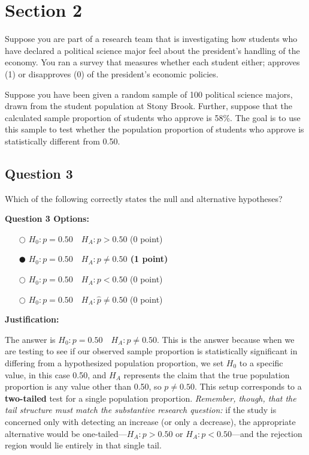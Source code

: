 \documentclass[12pt]{article}
\begin{document}
\section*{Section 2}

Suppose you are part of a research team that is investigating how students who have declared a political science major feel about the president’s handling of the economy. You ran a survey that measures whether each student either; approves (1) or disapproves (0) of the president’s economic policies.

Suppose you have been given a random sample of 100 political science majors, drawn from the student population at Stony Brook. Further, suppose that the calculated sample proportion of students who approve is 58\%. The goal is to use this sample to test whether the population proportion of students who approve is statistically different from 0.50.

\subsection*{Question 3 }
Which of the following correctly states the null and alternative hypotheses?

\medskip\noindent\textbf{Question 3 Options:}
\begin{itemize}[leftmargin=2em, labelsep=0.5em, itemsep=0.3em, topsep=0.3em]
    \item[$\bigcirc$] $H_0: p = 0.50 \quad H_A: p > 0.50$ (0 point)
    \item[$\mdlgblkcircle$] \textbf{$H_0: p = 0.50 \quad H_A: p \neq 0.50$ (1 point)}
    \item[$\bigcirc$] $H_0: p = 0.50 \quad H_A: p < 0.50$ (0 point)
    \item[$\bigcirc$] $H_0: p = 0.50 \quad H_A: \hat{p} \neq 0.50$ (0 point)
\end{itemize}

\medskip\noindent\textbf{Justification:}

The answer is $H_0\!: p = 0.50 \quad H_A\!: p \neq 0.50$.  
This is the answer because when we are testing to see if our observed sample proportion is statistically significant in differing from a hypothesized population proportion, we set $H_0$ to a specific value, in this case 0.50, and $H_A$ represents the claim that the true population proportion is any value other than 0.50, so $p \neq 0.50$.  
This setup corresponds to a \textbf{two-tailed} test for a single population proportion.  
\emph{Remember, though, that the tail structure must match the substantive research question:} if the study is concerned only with detecting an increase (or only a decrease), the appropriate alternative would be one-tailed—$H_A\!: p > 0.50$ or $H_A\!: p < 0.50$—and the rejection region would lie entirely in that single tail.
\end{document}
